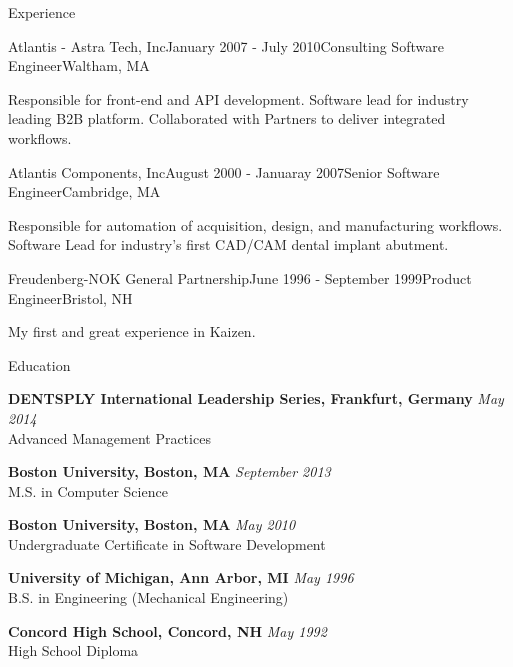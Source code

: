 \documentclass{resume}
\begin{document}
\begin{rSection}{Experience}
\begin{rSubsection}{Atlantis - Astra Tech, Inc}{January 2007 - July 2010}{Consulting Software Engineer}{Waltham, MA}
\item Responsible for front-end and API development. Software lead for industry leading B2B platform. Collaborated with Partners to deliver integrated workflows.
\end{rSubsection}

\begin{rSubsection}{Atlantis Components, Inc}{August 2000 - Januaray 2007}{Senior Software Engineer}{Cambridge, MA}
\item Responsible for automation of acquisition, design, and manufacturing workflows. Software Lead for industry's first CAD/CAM dental implant abutment.
\end{rSubsection}


\begin{rSubsection}{Freudenberg-NOK General Partnership}{June 1996 - September 1999}{Product Engineer}{Bristol, NH}
\item My first and great experience in Kaizen.
\end{rSubsection}

\end{rSection}

\begin{rSection}{Education}

\item {\bf DENTSPLY International Leadership Series, Frankfurt, Germany} \hfill {\em May 2014} \\
Advanced Management Practices

\item {\bf Boston University, Boston, MA} \hfill {\em September 2013} \\
M.S. in Computer Science

\item {\bf Boston University, Boston, MA} \hfill {\em May 2010} \\
Undergraduate Certificate in Software Development

\item {\bf University of Michigan, Ann Arbor, MI} \hfill {\em May 1996} \\
B.S. in Engineering (Mechanical Engineering)

\item {\bf Concord High School, Concord, NH} \hfill {\em May 1992} \\
High School Diploma

\end{rSection}
\end{document}
